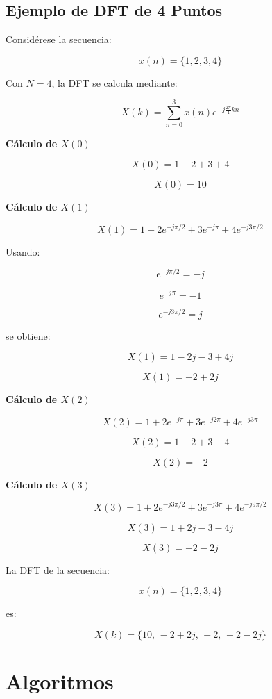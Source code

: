 \documentclass[12pt]{article}
\begin{document}
\subsection{Ejemplo de DFT de 4 Puntos}

Considérese la secuencia:

\[
x(n)=\{1,2,3,4\}
\]

Con \(N=4\), la DFT se calcula mediante:

\[
X(k)=\sum_{n=0}^{3} x(n)e^{-j\frac{2\pi}{4}kn}
\]

\textbf{Cálculo de \(X(0)\)}

\[
X(0)=1+2+3+4
\]

\[
X(0)=10
\]

\textbf{Cálculo de \(X(1)\)}

\[
X(1)=1+2e^{-j\pi/2}+3e^{-j\pi}+4e^{-j3\pi/2}
\]

Usando:

\[
e^{-j\pi/2}=-j
\]

\[
e^{-j\pi}=-1
\]

\[
e^{-j3\pi/2}=j
\]

se obtiene:

\[
X(1)=1-2j-3+4j
\]

\[
X(1)=-2+2j
\]

\textbf{Cálculo de \(X(2)\)}

\[
X(2)=1+2e^{-j\pi}+3e^{-j2\pi}+4e^{-j3\pi}
\]

\[
X(2)=1-2+3-4
\]

\[
X(2)=-2
\]

\textbf{Cálculo de \(X(3)\)}

\[
X(3)=1+2e^{-j3\pi/2}+3e^{-j3\pi}+4e^{-j9\pi/2}
\]

\[
X(3)=1+2j-3-4j
\]

\[
X(3)=-2-2j
\]


La DFT de la secuencia:

\[
x(n)=\{1,2,3,4\}
\]

es:

\[
X(k)=\{10,\,-2+2j,\,-2,\,-2-2j\}
\]
\section{Algoritmos}
\end{document}
